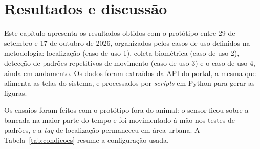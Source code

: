 %
%
%

\chapter{Resultados e discussão}
\label{cap:resultados}

Este capítulo apresenta os resultados obtidos com o protótipo entre 29 de setembro e 17 de outubro de 2026, organizados pelos casos de uso definidos na metodologia: localização (caso de uso 1), coleta biométrica (caso de uso 2), detecção de padrões repetitivos de movimento (caso de uso 3) e o caso de uso 4, ainda em andamento. Os dados foram extraídos da API do portal, a mesma que alimenta as telas do sistema, e processados por \textit{scripts} em Python para gerar as figuras.

Os ensaios foram feitos com o protótipo fora do animal: o sensor ficou sobre a bancada na maior parte do tempo e foi movimentado à mão nos testes de padrões, e a \textit{tag} de localização permaneceu em área urbana. %
A Tabela~\ref{tab:condicoes} resume a configuração usada.

